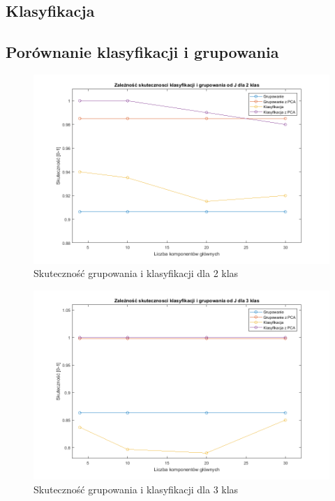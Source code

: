 \subsection{Klasyfikacja}

\subsection{Porównanie klasyfikacji i grupowania}

\begin{figure}[H]
	\centering
	\hspace*{-0.8in}
	\includegraphics[scale = 0.7]{img/acc_from_J_2classes.png}
	\caption{Skuteczność grupowania i klasyfikacji dla 2 klas}  
	\label{rys:acc_from_J_2classes} 
\end{figure}

\begin{figure}[H]
	\centering
	\hspace*{-0.8in}
	\includegraphics[scale = 0.7]{img/acc_from_J_3classes.png}
	\caption{Skuteczność grupowania i klasyfikacji dla 3 klas}  
	\label{rys:acc_from_J_3classes} 
\end{figure}


